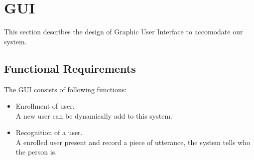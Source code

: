 \section{GUI}
	This section describes the design of Graphic User Interface to accomodate our system.
\subsection{Functional Requirements}
	The GUI consists of following functions:
	\begin{itemize}
		\item Enrollment of user. \\
			A new user can be dynamically add to this system.
		\item Recognition of a user. \\
			A enrolled user present and record a piece of utterance,
			the system tells who the person is.
	\end{itemize}
